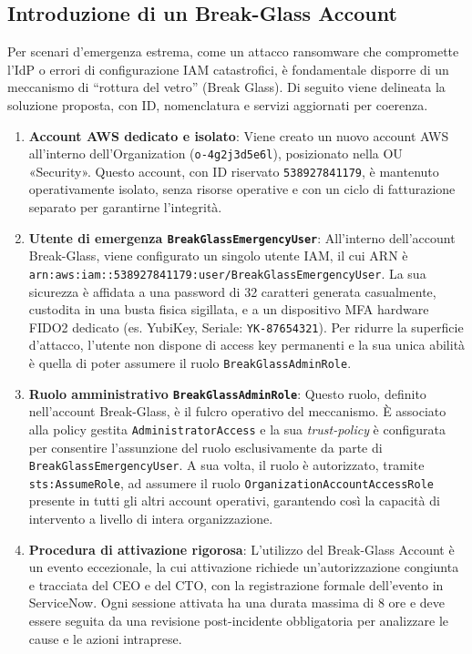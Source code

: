 \subsection{Introduzione di un Break-Glass Account}
\label{subsubsec:break_glass_account_iam}

Per scenari d’emergenza estrema, come un attacco ransomware che compromette l'IdP o errori di configurazione IAM catastrofici, è fondamentale disporre di un meccanismo di “rottura del vetro” (Break Glass). Di seguito viene delineata la soluzione proposta, con ID, nomenclatura e servizi aggiornati per coerenza.

\begin{enumerate}
\item \textbf{Account AWS dedicato e isolato}:
Viene creato un nuovo account AWS all'interno dell'Organization (\texttt{o-4g2j3d5e6l}), posizionato nella OU «Security». Questo account, con ID riservato \texttt{538927841179}, è mantenuto operativamente isolato, senza risorse operative e con un ciclo di fatturazione separato per garantirne l'integrità.

\item \textbf{Utente di emergenza \texttt{BreakGlassEmergencyUser}}:
All'interno dell'account Break-Glass, viene configurato un singolo utente IAM, il cui ARN è \texttt{arn:aws:iam::538927841179:user/BreakGlassEmergencyUser}. La sua sicurezza è affidata a una password di 32 caratteri generata casualmente, custodita in una busta fisica sigillata, e a un dispositivo MFA hardware FIDO2 dedicato (es. YubiKey, Seriale: \texttt{YK-87654321}). Per ridurre la superficie d'attacco, l'utente non dispone di access key permanenti e la sua unica abilità è quella di poter assumere il ruolo \texttt{BreakGlassAdminRole}.

\item \textbf{Ruolo amministrativo \texttt{BreakGlassAdminRole}}:
Questo ruolo, definito nell'account Break-Glass, è il fulcro operativo del meccanismo. È associato alla policy gestita \texttt{AdministratorAccess} e la sua \emph{trust-policy} è configurata per consentire l'assunzione del ruolo esclusivamente da parte di \texttt{BreakGlassEmergencyUser}. A sua volta, il ruolo è autorizzato, tramite \texttt{sts:AssumeRole}, ad assumere il ruolo \texttt{OrganizationAccountAccessRole} presente in tutti gli altri account operativi, garantendo così la capacità di intervento a livello di intera organizzazione.

\item \textbf{Procedura di attivazione rigorosa}:
L'utilizzo del Break-Glass Account è un evento eccezionale, la cui attivazione richiede un'autorizzazione congiunta e tracciata del CEO e del CTO, con la registrazione formale dell'evento in ServiceNow. Ogni sessione attivata ha una durata massima di 8 ore e deve essere seguita da una revisione post-incidente obbligatoria per analizzare le cause e le azioni intraprese.


\end{enumerate}
